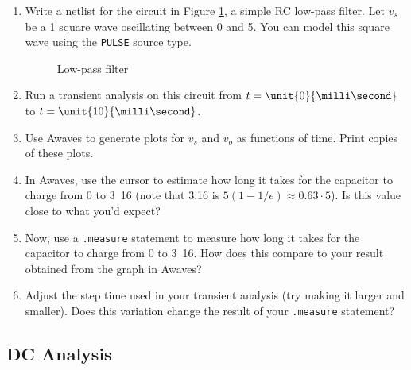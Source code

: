 \documentclass{article}
\begin{document}
\begin{enumerate}
\item Write a netlist for the circuit in Figure \ref{rc}, a simple RC low-pass filter. Let $v_s$ be a \unit{1}{\kilo\hertz} square wave oscillating between \unit{0}{\volt} and \unit{5}{\volt}. You can model this square wave using the \texttt{PULSE} source type.

	\begin{figure}[!htb]
		
		\centerline{\box\graph}
		\caption{Low-pass filter}
		\label{rc}
	\end{figure}

\item Run a transient analysis on this circuit from $t=\unit{0}{\milli\second}$ to $t=\unit{10}{\milli\second}$.
\item Use Awaves to generate plots for $v_s$ and $v_o$ as functions of time. Print copies of these plots.
\item In Awaves, use the cursor to estimate how long it takes for the capacitor to charge from \unit{0}{\volt} to \unit{3.16}{\volt} (note that 3.16 is $5\left(1-1/e\right) \approx 0.63 \cdot 5$). Is this value close to what you'd expect?
\item Now, use a \texttt{.measure} statement to measure how long it takes for the capacitor to charge from \unit{0}{\volt} to \unit{3.16}{\volt}. How does this compare to your result obtained from the graph in Awaves? 
\item Adjust the step time used in your transient analysis (try making it larger and smaller). Does this variation change the result of your \texttt{.measure} statement?

\end{enumerate}

\subsection{DC Analysis}
\end{document}

